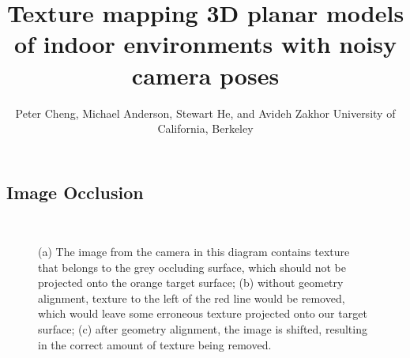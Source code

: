 \documentclass[]{spie}  %
\title{Texture mapping 3D planar models of indoor environments with noisy camera poses}
\author{Peter Cheng, Michael Anderson, Stewart He, and Avideh Zakhor
\skiplinehalf
University of California, Berkeley\\
}
\begin{document}
\subsection{Image Occlusion}
\label{sec:imageOcclusion}

\begin{figure}
  \centering
   \\
  \hspace{3in} 
  
  \caption{(a) The image from the camera in this diagram contains
    texture that belongs to the grey occluding surface, which should
    not be projected onto the orange target surface; (b) without
    geometry alignment, texture to the left of the red line would be
    removed, which would leave some erroneous texture projected onto
    our target surface; (c) after geometry alignment, the image is
    shifted, resulting in the correct amount of texture being
    removed.}
  \label{fig:occlusion}
\end{figure}
\end{document}
